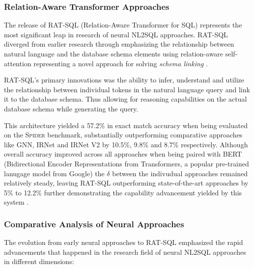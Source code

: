 \subsubsection{Relation-Aware Transformer Approaches}

The release of RAT-SQL (Relation-Aware Transformer for SQL) \cite{RATSQL} represents the most significant leap in research of
neural NL2SQL approaches. RAT-SQL diverged from earlier research through emphasizing the relationship between natural language
and the database schema elements using relation-aware self-attention representing a novel approach for solving \textit{schema 
linking} \citep{RATSQL}.

RAT-SQL's primary innovations was the ability to infer, understand and utilize the relationship between individual tokens in the 
natural language query and link it to the database schema. Thus allowing for reasoning capabilities on the actual database schema
while generating the query.

This architecture yielded a 57.2\% in exact match accuracy when being evaluated on the \textsc{Spider} benchmark, substantially
outperforming comparative approaches like GNN, IRNet and IRNet V2 by 10.5\%, 9.8\% and 8.7\% respectively. Although overall
accuracy improved across all approaches when being paired with BERT (Bidirectional Encoder Representations from Transformers, a 
popular pre-trained lanugage model from Google) the $\delta$ between the indivudual approaches remained relatively steady, leaving
RAT-SQL outperforming state-of-the-art approaches by 5\% to 12.2\% further demonstrating the capability advancement yielded by 
this system \citep{RATSQL}.

\subsubsection{Comparative Analysis of Neural Approaches}

The evolution from early neural approaches to RAT-SQL emphasized the rapid advancements that happened in the research field of 
neural NL2SQL approaches in different dimensions:

